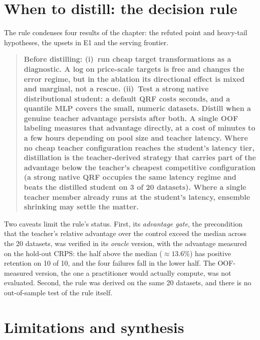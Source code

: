 \section{When to distill: the decision rule}
\label{sec:destil-regra}

The rule condenses four results of the chapter: the refuted point
and heavy-tail hypotheses, the upsets in E1 and the serving
frontier.

\begin{quote}
\textbf{Before distilling: (i)~run cheap target transformations as a
diagnostic. A log on price-scale targets is free and changes the
error regime, but in the ablation its directional effect is mixed
and marginal, not a rescue. (ii)~Test a strong native distributional
student: a default QRF costs seconds, and a quantile MLP covers the
small, numeric datasets. Distill when a genuine teacher advantage
persists after both. A single OOF labeling measures that advantage
directly, at a cost of minutes to a few hours depending on pool size
and teacher latency. Where no cheap teacher configuration reaches
the student's latency tier, distillation is the teacher-derived
strategy that carries part of the advantage below the teacher's
cheapest competitive configuration (a strong native QRF occupies the
same latency regime and beats the distilled student on 3 of 20
datasets). Where a single teacher member already runs at the
student's latency, ensemble shrinking may settle the matter.}
\end{quote}

Two caveats limit the rule's status. First, its
\emph{advantage gate}, the precondition that the teacher's relative
advantage over the control exceed the median across the 20 datasets,
was verified in its \emph{oracle} version, with the advantage measured on the hold-out CRPS: the half above the median (${\approx}13.6\%$) has positive retention on 10 of 10, and the four failures fall in the lower half. The OOF-measured version, the one a
practitioner would actually compute, was not evaluated. Second, the
rule was derived on the same 20 datasets, and there is no
out-of-sample test of the rule itself.

\section{Limitations and synthesis}
\label{sec:destil-limitacoes}

